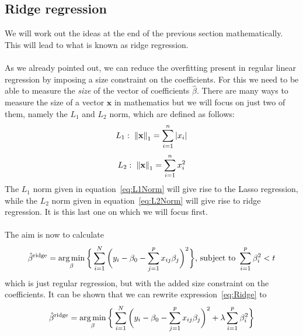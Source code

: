 \subsection{Ridge regression} \label{sec:RidgeRegression}
We will work out the ideas at the end of the previous section mathematically. This will lead to what is known as ridge regression.\\
\\
As we already pointed out, we can reduce the overfitting present in regular linear regression by imposing a size constraint on the coefficients. For this we need to be able to measure the \textit{size} of the vector of coefficients $\hat{\beta}$. There are many ways to measure the size of a vector $\textbf{x}$ in mathematics but we will focus on just two of them, namely the $L_1$ and $L_2$ norm, which are defined as follows:
\begin{equation} \label{eq:L1Norm}
    L_1: \hspace{3pt} \left\lVert\textbf{x}\right\rVert_1 = \sum_{i=1}^n |x_i|
\end{equation}
\begin{equation} \label{eq:L2Norm}
    L_2: \hspace{3pt} \left\lVert\textbf{x}\right\rVert_1 = \sum_{i=1}^n x_i^2
\end{equation}
The $L_1$ norm given in equation~\eqref{eq:L1Norm} will give rise to the Lasso regression, while the $L_2$ norm given in equation~\eqref{eq:L2Norm} will give rise to ridge regression. It is this last one on which we will focus first.\\
\\
The aim is now to calculate
\begin{equation} \label{eq:Ridge}
    \begin{aligned}
        \hat{\beta}{}^{\text{ridge}} = \argmin_{\beta}\bigg\{\sum_{i=1}^N \bigg(y_i - \beta_0 - \sum_{j=1}^p x_{ij}\beta_j\bigg)^2\bigg\} \newline \text{, subject to } \sum_{i=1}^p \beta_i^2 < t
    \end{aligned}
\end{equation}
which is just regular regression, but with the added size constraint on the coefficients. It can be shown that we can rewrite expression~\eqref{eq:Ridge} to
\begin{equation}\label{eq:RidgeAlt}
        \hat{\beta}{}^{\text{ridge}} = \operatorname*{arg\,min}_{\beta}\bigg\{\sum_{i=1}^N \bigg( y_i - \beta_0 - \sum_{j=1}^p x_{ij}\beta_j\bigg)^2 + \lambda \sum_{i=1}^p \beta_i^2\bigg\}
\end{equation}
